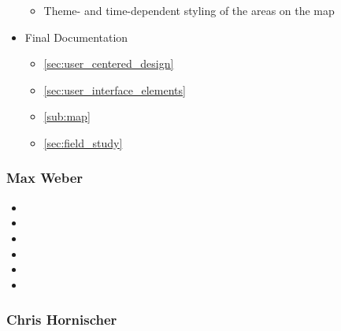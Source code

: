 \begin{itemize}
\begin{itemize}
    \item Theme- and time-dependent styling of the areas on the map
  \end{itemize}
  \item Final Documentation
  \begin{itemize}
    \item \ref{sec:user_centered_design} 
    \item \ref{sec:user_interface_elements} 
    \item \ref{sub:map} 
    \item \ref{sec:field_study} 
  \end{itemize}
\end{itemize}


\subsubsection{Max Weber} %
\label{ssub:max_weber}

\begin{itemize}
  \item
  \item
  \item
  \item
  \item
  \item
\end{itemize}


\subsubsection{Chris Hornischer} %
\label{ssub:chris_hornischer}

